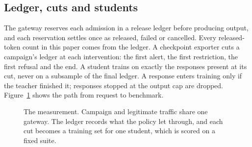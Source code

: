 \documentclass[journal]{IEEEtran}
\begin{document}
\subsection{Ledger, cuts and students}
The gateway reserves each admission in a release ledger before producing output, and each reservation settles once as released, failed or cancelled. Every released-token count in this paper comes from the ledger. A checkpoint exporter cuts a campaign's ledger at each intervention: the first alert, the first restriction, the first refusal and the end. A student trains on exactly the responses present at its cut, never on a subsample of the final ledger. A response enters training only if the teacher finished it; responses stopped at the output cap are dropped. Figure~\ref{fig:bench} shows the path from request to benchmark.

\begin{figure}[!t]
\centering
{}
\caption{The measurement. Campaign and legitimate traffic share one gateway. The ledger records what the policy let through, and each cut becomes a training set for one student, which is scored on a fixed suite.}
\label{fig:bench}
\end{figure}
\end{document}
